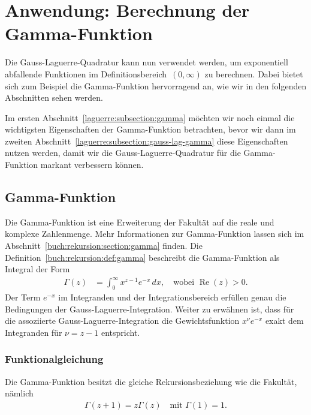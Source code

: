 %
%
%
\section{Anwendung: Berechnung der
  Gamma-Funktion%
  \label{laguerre:section:quad-gamma}}
%
Die Gauss-Laguerre-Quadratur kann nun verwendet werden,
um exponentiell abfallende Funktionen im Definitionsbereich~$(0, \infty)$
zu berechnen.
Dabei bietet sich zum Beispiel die Gamma-Funktion hervorragend an,
wie wir in den folgenden Abschnitten sehen werden.

Im ersten Abschnitt~\ref{laguerre:subsection:gamma} möchten wir noch einmal
die wichtigsten Eigenschaften der Gamma-Funktion betrachten,
bevor wir dann im zweiten Abschnitt~\ref{laguerre:subsection:gauss-lag-gamma}
diese Eigenschaften nutzen werden,
damit wir die Gauss-Laguerre-Quadratur für die Gamma-Funktion
markant verbessern können.

\subsection{Gamma-Funktion%
\label{laguerre:subsection:gamma}}
Die Gamma-Funktion ist eine Erweiterung der Fakultät auf die reale und komplexe
Zahlenmenge.
Mehr Informationen zur Gamma-Funktion lassen sich im
Abschnitt~\ref{buch:rekursion:section:gamma} finden.
Die Definition~\ref{buch:rekursion:def:gamma} beschreibt die Gamma-Funktion als
Integral der Form
\begin{align}
\Gamma(z)
 & =
\int_0^\infty x^{z-1} e^{-x} \, dx
,
\quad
\text{wobei } \operatorname{Re}(z) > 0
\label{laguerre:gamma}
.
\end{align}
Der Term $e^{-x}$ im Integranden und der Integrationsbereich erfüllen
genau die Bedingungen der Gauss-Laguerre-Integration.
Weiter zu erwähnen ist, dass für die assoziierte Gauss-Laguerre-Integration die
Gewichtsfunktion $x^\nu e^{-x}$  exakt dem Integranden
für $\nu = z - 1$ entspricht.

\subsubsection{Funktionalgleichung}
Die Gamma-Funktion besitzt die gleiche Rekursionsbeziehung wie die Fakultät,
nämlich
\begin{align}
\Gamma(z+1)
=
z \Gamma(z)
\quad
\text{mit }
\Gamma(1)
=
1
.
\label{laguerre:gamma_funktional}
\end{align}

